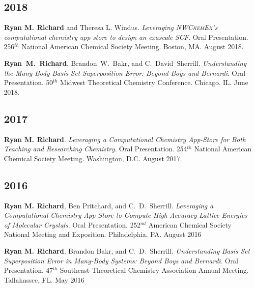 \begin{etaremune}
	\subsection{2018}
	\item{\textbf{Ryan M. Richard} and Theresa L. Windus. \textit{Leveraging
	      \textsc{NWChemEx}'s computational chemistry app store to design an
		  exascale {SCF}}. Oral Presentation. 256$^{th}$ National American
		  Chemical Society Meeting. Boston, MA. August 2018.}
	\item{\textbf{Ryan~M.~Richard}, Brandon~W.~Bakr, and C.~David~Sherrill.
	      \textit{Understanding the Many-Body Basis Set Superposition Error:
		  Beyond Boys and Bernardi}.  Oral Presentation. 50$^{th}$ Midwest
		  Theoretical Chemistry Conference. Chicago, IL. June 2018.}

	\subsection{2017}
	\item{\textbf{Ryan M. Richard}. \textit{Leveraging a Computational Chemistry
	      App-Store for Both Teaching and Researching Chemistry}. Oral
		  Presentation. 254$^{th}$ National American Chemical Society Meeting.
		  Washington, D.C. August 2017.}

	\subsection{2016}
	\item{\textbf{Ryan M. Richard}, Ben Pritchard, and C.~D.~Sherrill.
	      \textit{Leveraging a Computational Chemistry App Store to Compute
		  High Accuracy Lattice Energies of Molecular Crystals}.  Oral
		  Presentation.  252$^{nd}$ American Chemical Society National Meeting
		  and Exposition.  Philadelphia, PA. August 2016}
	\item{\textbf{Ryan M. Richard}, Brandon Bakr, and C.~D.~Sherrill.
	      \textit{Understanding Basis Set Superposition Error in Many-Body
		  Systems: Beyond Boys and Bernardi}.  Oral Presentation.  47$^{th}$
		  Southeast Theoretical Chemistry Association Annual Meeting.
		  Tallahassee, FL. May 2016}


\end{etaremune}
